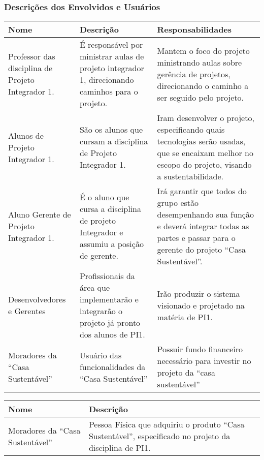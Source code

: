 \subsubsection{Descrições dos Envolvidos e Usuários}


\begin{longtable}{|m{5cm}|m{5cm}|m{5cm}|}
	\hline \textbf{Nome} & \textbf{Descrição} & \textbf{Responsabilidades}\\
	\hline Professor das disciplina de Projeto Integrador 1. & É responsável por ministrar aulas de projeto integrador
	1, direcionando caminhos para o projeto. & Mantem o foco do projeto ministrando aulas sobre gerência de projetos,
	direcionando o caminho a ser seguido pelo projeto. \\
	\hline Alunos de  Projeto Integrador 1. & São os alunos que cursam a disciplina de  Projeto Integrador 1. & Iram
	desenvolver o projeto, especificando quais tecnologias serão usadas, que se encaixam melhor no escopo do projeto,
	visando a sustentabilidade.\\
	\hline Aluno Gerente de Projeto Integrador 1. & É o aluno que cursa a disciplina de projeto Integrador e assumiu a
	posição de gerente. & Irá garantir que todos do grupo estão desempenhando sua função e deverá integrar todas as
	partes e passar para o gerente do projeto “Casa Sustentável”.\\
	\hline Desenvolvedores e Gerentes & Profissionais da área que implementarão e integrarão o projeto já pronto dos
	alunos de PI1. & Irão produzir o sistema visionado e projetado na matéria de PI1.\\
	\hline Moradores da “Casa Sustentável” & Usuário das funcionalidades da “Casa Sustentável” & Possuir fundo
	financeiro necessário para investir no projeto da “casa sustentável”\\
	\hline
\end{longtable}


\begin{longtable}{|m{5cm}|m{10cm}|}
	\hline \textbf{Nome} & \textbf{Descrição}\\
	\hline Moradores da “Casa Sustentável” & Pessoa Física que adquiriu o produto “Casa Sustentável”, especificado no
	projeto da disciplina de PI1.\\
	\hline
\end{longtable}


